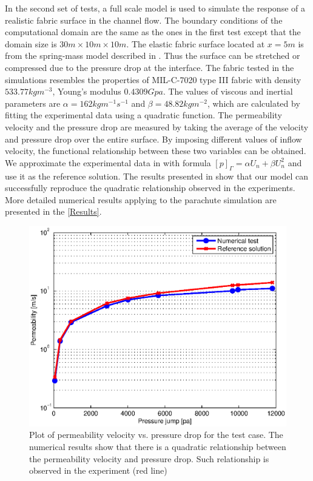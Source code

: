In the second set of tests, a full scale model is used to simulate the response
of a realistic fabric surface in the channel flow.  The boundary conditions of
the computational domain are the same as the ones in the first test except that
the domain size is $30m\times 10m\times 10m$. The elastic fabric surface
located at $x = 5m$ is from the spring-mass model described in \cite{Shi2015}.
Thus the surface can be stretched or compressed due to the pressure drop at the
interface.  The fabric tested in the simulations resembles the properties of
MIL-C-7020 type III fabric \cite{ewing1978recovery} with density
$533.77kgm^{-3}$, Young's modulus $0.4309Gpa$. The values of viscous and
inertial parameters are $\alpha = 162kgm^{-1}s^{-1}$ and $\beta =
48.82kgm^{-2}$, which are calculated by fitting the experimental data using a
quadratic function.  The permeability velocity and the pressure drop are
measured by taking the average of the velocity and pressure drop over the
entire surface.  By imposing different values of inflow velocity, the
functional relationship between these two variables can be obtained. We
approximate the experimental data in \cite{ewing1978recovery} with formula
$[p]_{\Gamma} = \alpha U_n + \beta U_n^2$ and use it as the reference solution.
The results presented in  show that our model can successfully
reproduce the quadratic relationship observed in the experiments.
More detailed numerical results applying to the parachute simulation are 
presented in the \ref{Results}.

\begin{figure}[h] \centering
\includegraphics[width=1.0\columnwidth]{Figures/curve} \caption{Plot
of permeability velocity vs. pressure drop for the test case.
The numerical results show that there
is a quadratic relationship between the permeability velocity and
pressure drop. Such relationship is observed in the experiment (red line)}
\label{fig:curve} \end{figure}

